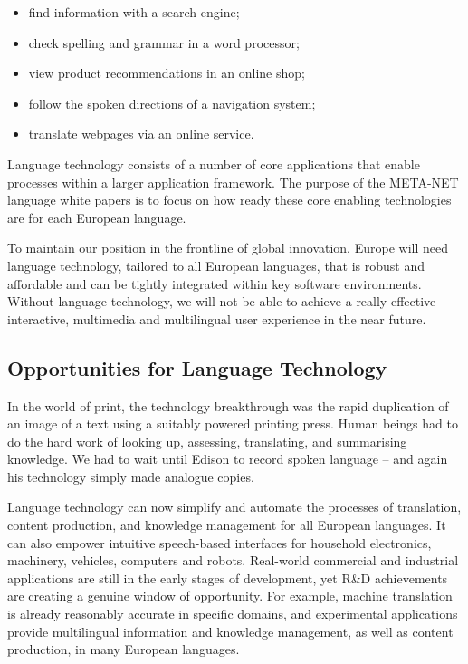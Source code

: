 \begin{multicols}{2}
\begin{itemize}
\item find information with a search engine;
\item check spelling and grammar in a word processor;
\item view product recommendations in an online shop;
\item follow the spoken directions of a navigation system;
\item translate webpages via an online service.
\end{itemize}

Language technology consists of a number of core applications that enable processes within a larger application framework. The purpose of the META-NET language white papers is to focus on how ready these core enabling technologies are for each European language. 

To maintain our position in the frontline of global innovation, Europe will need language technology, tailored to all European languages, that is robust and affordable and can be tightly integrated within key software environments. Without language technology, we will not be able to achieve a really effective interactive, multimedia and multilingual user experience in the near future.

\subsection{Opportunities for Language Technology}

In the world of print, the technology breakthrough was the rapid duplication of an image of a text using a suitably powered printing press. Human beings had to do the hard work of looking up, assessing, translating, and summarising knowledge. We had to wait until Edison to record spoken language -- and again his technology simply made analogue copies.

Language technology can now simplify and automate the processes of translation, content production, and knowledge management for all European languages. It can also empower intuitive speech-based interfaces for household electronics, machinery, vehicles, computers and robots. Real-world commercial and industrial applications are still in the early stages of development, yet R\&D achievements are creating a genuine window of opportunity. For example, machine translation is already reasonably accurate in specific domains, and experimental applications provide multilingual information and knowledge management, as well as content production, in many European languages. 


\end{multicols}
